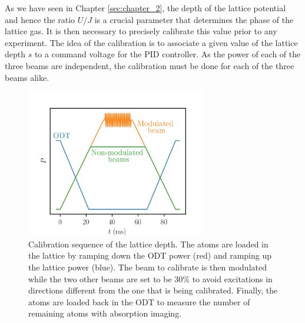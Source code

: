 As we have seen in Chapter \ref{sec:chapter_2}, the depth of the lattice potential and hence the ratio $U/J$ is a crucial parameter that determines the phase of the lattice gas. It is then necessary to precisely calibrate this value prior to any experiment. The idea of the calibration is to associate a given value of the lattice depth $s$ to a command voltage for the PID controller. As the power of each of the three beams are independent, the calibration must be done for each of the three beams alike. 

\begin{figure}
    \centering
    \includegraphics[width=0.7\textwidth]{Fig/Chapter3/lattice_modulation.png}
    \caption[Calibration sequence of the lattice depth]{Calibration sequence of the lattice depth. The atoms are loaded in the lattice by ramping down the ODT power (red) and ramping up the lattice power (blue). The beam to calibrate is then modulated while the two other beams are set to be $30 \%$ to avoid excitations in directions different from the one that is being calibrated. Finally, the atoms are loaded back in the ODT to measure the number of remaining atoms with absorption imaging.}
    \label{fig:calib_process}
\end{figure}

